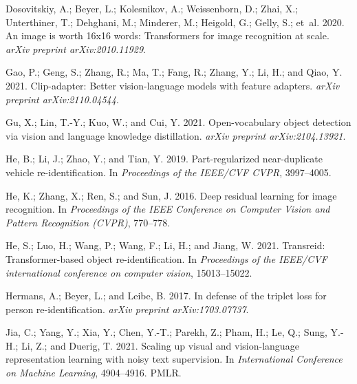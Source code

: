 \documentclass[letterpaper]{article} \usepackage{aaai23}  \usepackage{times}  \usepackage{helvet}  \usepackage{courier}  \usepackage[hyphens]{url}  \usepackage{graphicx} \urlstyle{rm} \def\UrlFont{\rm}  \usepackage{natbib}  \usepackage{caption} \frenchspacing  \setlength{\pdfpagewidth}{8.5in}  \setlength{\pdfpageheight}{11in}  \usepackage{algorithm}
\begin{document}
\begin{small}
\begin{thebibliography}{65}
Dosovitskiy, A.; Beyer, L.; Kolesnikov, A.; Weissenborn, D.; Zhai, X.;
  Unterthiner, T.; Dehghani, M.; Minderer, M.; Heigold, G.; Gelly, S.; et~al.
  2020.
\newblock An image is worth 16x16 words: Transformers for image recognition at
  scale.
\newblock \emph{arXiv preprint arXiv:2010.11929}.

Gao, P.; Geng, S.; Zhang, R.; Ma, T.; Fang, R.; Zhang, Y.; Li, H.; and Qiao, Y.
  2021.
\newblock Clip-adapter: Better vision-language models with feature adapters.
\newblock \emph{arXiv preprint arXiv:2110.04544}.

Gu, X.; Lin, T.-Y.; Kuo, W.; and Cui, Y. 2021.
\newblock Open-vocabulary object detection via vision and language knowledge
  distillation.
\newblock \emph{arXiv preprint arXiv:2104.13921}.

He, B.; Li, J.; Zhao, Y.; and Tian, Y. 2019.
\newblock Part-regularized near-duplicate vehicle re-identification.
\newblock In \emph{Proceedings of the IEEE/CVF CVPR}, 3997--4005.

He, K.; Zhang, X.; Ren, S.; and Sun, J. 2016.
\newblock Deep residual learning for image recognition.
\newblock In \emph{Proceedings of the IEEE Conference on Computer Vision and
  Pattern Recognition (CVPR)}, 770--778.

He, S.; Luo, H.; Wang, P.; Wang, F.; Li, H.; and Jiang, W. 2021.
\newblock Transreid: Transformer-based object re-identification.
\newblock In \emph{Proceedings of the IEEE/CVF international conference on
  computer vision}, 15013--15022.

Hermans, A.; Beyer, L.; and Leibe, B. 2017.
\newblock In defense of the triplet loss for person re-identification.
\newblock \emph{arXiv preprint arXiv:1703.07737}.

Jia, C.; Yang, Y.; Xia, Y.; Chen, Y.-T.; Parekh, Z.; Pham, H.; Le, Q.; Sung,
  Y.-H.; Li, Z.; and Duerig, T. 2021.
\newblock Scaling up visual and vision-language representation learning with
  noisy text supervision.
\newblock In \emph{International Conference on Machine Learning}, 4904--4916.
  PMLR.


\end{thebibliography}
\end{small}
\end{document}
